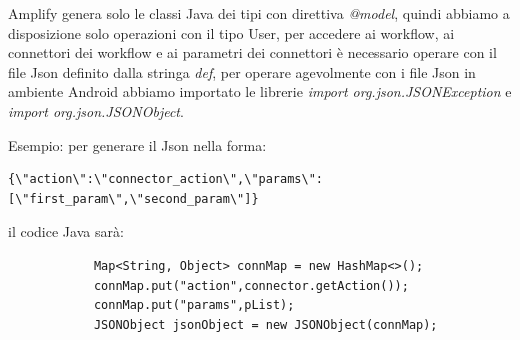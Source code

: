 Amplify genera solo le classi Java dei tipi con direttiva \textit{@model}, quindi abbiamo a disposizione solo operazioni con il tipo User, per accedere ai workflow, ai connettori dei workflow e ai parametri dei connettori è necessario operare con il file Json definito dalla stringa \textit{def}, per operare agevolmente con i file Json in ambiente Android abbiamo importato le librerie \textit{import org.json.JSONException} e \textit{import org.json.JSONObject}.

Esempio: per generare il Json nella forma:

\begin{verbatim}
{\"action\":\"connector_action\",\"params\":[\"first_param\",\"second_param\"]}
\end{verbatim}

il codice Java sarà:

\begin{verbatim}
            Map<String, Object> connMap = new HashMap<>();
            connMap.put("action",connector.getAction());
            connMap.put("params",pList);
            JSONObject jsonObject = new JSONObject(connMap);
\end{verbatim}



